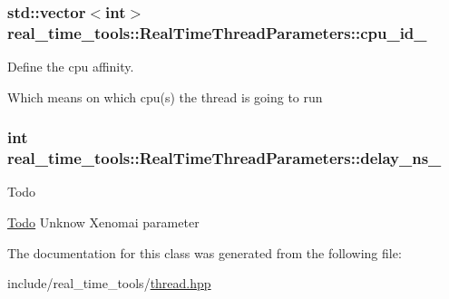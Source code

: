 \subsubsection[{\texorpdfstring{cpu\+\_\+id\+\_\+}{cpu_id_}}]{\setlength{\rightskip}{0pt plus 5cm}std\+::vector$<$int$>$ real\+\_\+time\+\_\+tools\+::\+Real\+Time\+Thread\+Parameters\+::cpu\+\_\+id\+\_\+}\hypertarget{classreal__time__tools_1_1RealTimeThreadParameters_ac6879cacfd97ddf46ad46b94a79a9696}{}\label{classreal__time__tools_1_1RealTimeThreadParameters_ac6879cacfd97ddf46ad46b94a79a9696}


Define the cpu affinity. 

Which means on which cpu(s) the thread is going to run 
\subsubsection[{\texorpdfstring{delay\+\_\+ns\+\_\+}{delay_ns_}}]{\setlength{\rightskip}{0pt plus 5cm}int real\+\_\+time\+\_\+tools\+::\+Real\+Time\+Thread\+Parameters\+::delay\+\_\+ns\+\_\+}\hypertarget{classreal__time__tools_1_1RealTimeThreadParameters_a50e8eae41f8284867f073aa802d9afa2}{}\label{classreal__time__tools_1_1RealTimeThreadParameters_a50e8eae41f8284867f073aa802d9afa2}
\begin{DoxyRefDesc}{Todo}
\item[\hyperlink{todo__todo000001}{Todo}]Unknow Xenomai parameter \end{DoxyRefDesc}


The documentation for this class was generated from the following file\+:\begin{DoxyCompactItemize}
\item 
include/real\+\_\+time\+\_\+tools/\hyperlink{thread_8hpp}{thread.\+hpp}\end{DoxyCompactItemize}
